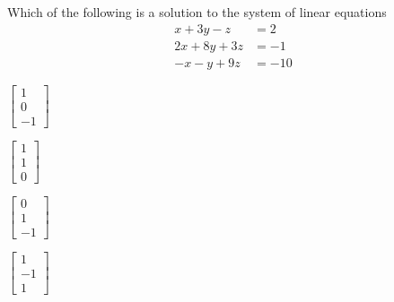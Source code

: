 \begin{readinessAssuranceTest}
\setcounter{enumi}{30}
\item Which of the following is a solution to the system of linear equations
      \begin{align*}
      x+3y-z    &=   2 \\
      2x+8y+3z  &=  -1 \\
      -x-y+9z   &= -10
      \end{align*}

\begin{multicols}{4}
\begin{readinessAssuranceTestChoices}
\item \(\begin{bmatrix} 1 \\ 0 \\ -1 \end{bmatrix}\)
\item \(\begin{bmatrix} 1 \\ 1 \\ 0 \end{bmatrix}\)
\item \(\begin{bmatrix} 0 \\ 1 \\ -1 \end{bmatrix}\)
\item \(\begin{bmatrix} 1 \\ -1 \\ 1 \end{bmatrix}\)
\end{readinessAssuranceTestChoices}
\end{multicols}

\end{readinessAssuranceTest}

